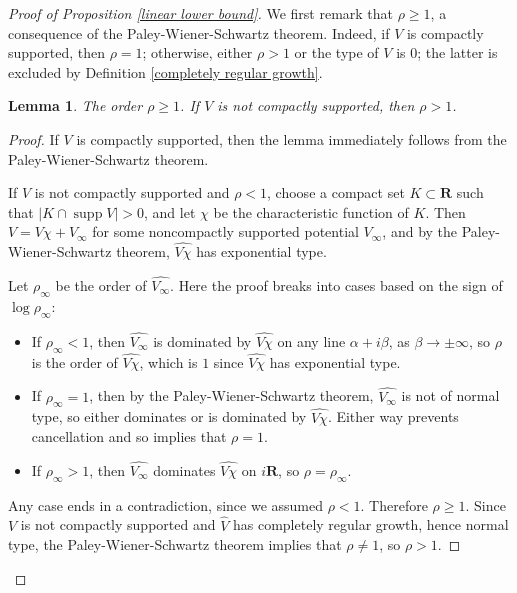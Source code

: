 \documentclass[reqno,12pt,letterpaper]{amsart}
\newcommand{\RR}{\mathbf{R}}
\DeclareMathOperator{\supp}{supp}
\newtheorem{lemma}[theorem]{Lemma}
\theoremstyle{definition}
\begin{document}
\begin{proof}[Proof of Proposition \ref{linear lower bound}]
We first remark that $\rho \geq 1$, a consequence of the Paley-Wiener-Schwartz theorem.
Indeed, if $V$ is compactly supported, then $\rho = 1$; otherwise, either $\rho > 1$ or the type of $V$ is $0$; the latter is excluded by Definition \ref{completely regular growth}.

\begin{lemma}
\label{order is log-positive}
The order $\rho \geq 1$. If $V$ is not compactly supported, then $\rho > 1$.
\end{lemma}
\begin{proof}
If $V$ is compactly supported, then the lemma immediately follows from the Paley-Wiener-Schwartz theorem.

If $V$ is not compactly supported and $\rho < 1$, choose a compact set $K \subset \RR$ such that $|K \cap \supp V| > 0$, and let $\chi$ be the characteristic function of $K$.
Then $V = V\chi + V_\infty$ for some noncompactly supported potential $V_\infty$, and by the Paley-Wiener-Schwartz theorem, $\widehat{V\chi}$ has exponential type.

Let $\rho_\infty$ be the order of $\widehat{V_\infty}$. Here the proof breaks into cases based on the sign of $\log \rho_\infty$:
\begin{itemize}
\item If $\rho_\infty < 1$, then $\widehat{V_\infty}$ is dominated by $\widehat{V\chi}$ on any line $\alpha + i\beta$, as $\beta \to \pm\infty$, so $\rho$ is the order of $\widehat{V\chi}$, which is $1$ since $\widehat{V\chi}$ has exponential type.
\item If $\rho_\infty = 1$, then by the Paley-Wiener-Schwartz theorem, $\widehat{V_\infty}$ is not of normal type, so either dominates or is dominated by $\widehat{V\chi}$. Either way prevents cancellation and so implies that $\rho = 1$.
\item If $\rho_\infty > 1$, then $\widehat{V_\infty}$ dominates $\widehat{V\chi}$ on $i\RR$, so $\rho = \rho_\infty$.
\end{itemize}
Any case ends in a contradiction, since we assumed $\rho < 1$. Therefore $\rho \geq 1$.
Since $V$ is not compactly supported and $\widehat V$ has completely regular growth, hence normal type, the Paley-Wiener-Schwartz theorem implies that $\rho \neq 1$, so $\rho > 1$.
\end{proof}


\end{proof}
\end{document}
